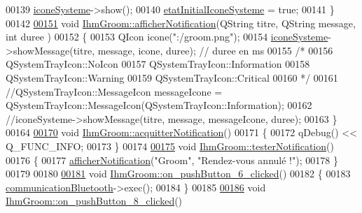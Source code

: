 \begin{DoxyCode}
00139     \hyperlink{class_ihm_groom_a9ca0929cf284a9a2e3e2bc3489249919}{iconeSysteme}->show();
00140     \hyperlink{class_ihm_groom_a95d2d2b4b3b849c1b21f234844fca056}{etatInitialIconeSysteme} = \textcolor{keyword}{true};
00141 \}
00142 
\hyperlink{class_ihm_groom_a55194db52eca3648aad391274a6bb709}{00151} \textcolor{keywordtype}{void} \hyperlink{class_ihm_groom_a55194db52eca3648aad391274a6bb709}{IhmGroom::afficherNotification}(QString titre, QString message, \textcolor{keywordtype}{int} duree
      )
00152 \{
00153     QIcon icone(\textcolor{stringliteral}{":/groom.png"});
00154     \hyperlink{class_ihm_groom_a9ca0929cf284a9a2e3e2bc3489249919}{iconeSysteme}->showMessage(titre, message, icone, duree); \textcolor{comment}{// duree en ms}
00155     \textcolor{comment}{/*}
00156 \textcolor{comment}{    QSystemTrayIcon::NoIcon}
00157 \textcolor{comment}{    QSystemTrayIcon::Information}
00158 \textcolor{comment}{    QSystemTrayIcon::Warning}
00159 \textcolor{comment}{    QSystemTrayIcon::Critical}
00160 \textcolor{comment}{    */}
00161     \textcolor{comment}{//QSystemTrayIcon::MessageIcon messageIcone =
       QSystemTrayIcon::MessageIcon(QSystemTrayIcon::Information);}
00162     \textcolor{comment}{//iconeSysteme->showMessage(titre, message, messageIcone, duree);}
00163 \}
00164 
\hyperlink{class_ihm_groom_a428ffaecbab91abb0824ad61afd3109e}{00170} \textcolor{keywordtype}{void} \hyperlink{class_ihm_groom_a428ffaecbab91abb0824ad61afd3109e}{IhmGroom::acquitterNotification}()
00171 \{
00172     qDebug() << Q\_FUNC\_INFO;
00173 \}
00174 
\hyperlink{class_ihm_groom_a53838a4bd054fe5c85c23eced3eacc8b}{00175} \textcolor{keywordtype}{void} \hyperlink{class_ihm_groom_a53838a4bd054fe5c85c23eced3eacc8b}{IhmGroom::testerNotification}()
00176 \{
00177     \hyperlink{class_ihm_groom_a55194db52eca3648aad391274a6bb709}{afficherNotification}(\textcolor{stringliteral}{"Groom"}, \textcolor{stringliteral}{"Rendez-vous annulé !"});
00178 \}
00179 
00180 
\hyperlink{class_ihm_groom_a1bbde232f2fb38daedaa4562dfc8d1b5}{00181} \textcolor{keywordtype}{void} \hyperlink{class_ihm_groom_a1bbde232f2fb38daedaa4562dfc8d1b5}{IhmGroom::on\_pushButton\_6\_clicked}()
00182 \{
00183     \hyperlink{class_ihm_groom_a8e2b551df75d8dffdfbc9beb6c3691ba}{communicationBluetooth}->exec();
00184 \}
00185 
\hyperlink{class_ihm_groom_ac69005aef7c31e888d64890eb45c5e64}{00186} \textcolor{keywordtype}{void} \hyperlink{class_ihm_groom_ac69005aef7c31e888d64890eb45c5e64}{IhmGroom::on\_pushButton\_8\_clicked}()

\end{DoxyCode}

